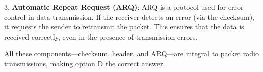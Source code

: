 3. \textbf{Automatic Repeat Request (ARQ)}: ARQ is a protocol used for error control in data transmission. If the receiver detects an error (via the checksum), it requests the sender to retransmit the packet. This ensures that the data is received correctly, even in the presence of transmission errors.

All these components—checksum, header, and ARQ—are integral to packet radio transmissions, making option D the correct answer.

